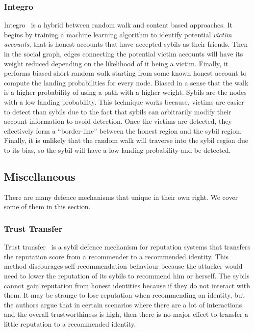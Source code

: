 \subsubsection{Integro}
Integro~\cite{boshmaf2015integro} is a hybrid between random walk and content
based approaches. It begins by training a machine learning algorithm to identify
potential \emph{victim accounts}, that is honest accounts that have accepted
sybils as their friends. Then in the social graph, edges connecting the
potential victim accounts will have its weight reduced depending on the
likelihood of it being a victim. Finally, it performs biased short random walk
starting from some known honest account to compute the landing probabilities for
every node. Biased in a sense that the walk is a higher probability of using a
path with a higher weight. Sybils are the nodes with a low landing probability.
This technique works because, victims are easier to detect than sybils due to
the fact that sybils can arbitrarily modify their account information to avoid
detection. Once the victims are detected, they effectively form a
``border-line'' between the honest region and the sybil region. Finally, it is
unlikely that the random walk will traverse into the sybil region due to its
bias, so the sybil will have a low landing probability and be detected.


\subsection{Miscellaneous}
There are many defence mechanisms that unique in their own right. We cover some
of them in this section.

\subsubsection{Trust Transfer}
Trust transfer~\cite{seigneur2005trust} is a sybil defence mechanism for
reputation systems that transfers the reputation score from a recommender to a
recommended identity. This method discourages self-recommendation behaviour
because the attacker would need to lower the reputation of its sybils to
recommend him or herself. The sybils cannot gain reputation from honest
identities because if they do not interact with them. It may be strange to lose
reputation when recommending an identity, but the authors argue that in certain
scenarios where there are a lot of interactions and the overall trustworthiness
is high, then there is no major effect to transfer a little reputation to
a recommended identity.


